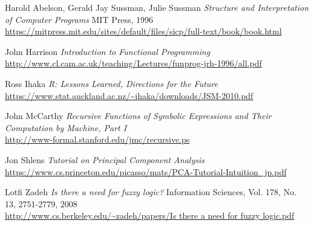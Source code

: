 \begin{thebibliography}{9}
  Harold Abelson, Gerald Jay Sussman, Julie Sussman
  \emph{Structure and Interpretation of Computer Programs}
  MIT Press, 1996 \\
  \url{https://mitpress.mit.edu/sites/default/files/sicp/full-text/book/book.html}

  John Harrison
  \emph{Introduction to Functional Programming} \\
  \url{http://www.cl.cam.ac.uk/teaching/Lectures/funprog-jrh-1996/all.pdf}

  Ross Ihaka
  \emph{R: Lessons Learned, Directions for the Future} \\
  \url{https://www.stat.auckland.ac.nz/~ihaka/downloads/JSM-2010.pdf}

  John McCarthy
  \emph{Recursive Functions of Symbolic Expressions and Their Computation by Machine, Part I} \\
  \url{http://www-formal.stanford.edu/jmc/recursive.ps}

  Jon Shlens
  \emph{Tutorial on Principal Component Analysis}
  \url{https://www.cs.princeton.edu/picasso/mats/PCA-Tutorial-Intuition_jp.pdf}

  Lotfi Zadeh
  \emph{Is there a need for fuzzy logic?}
  Information Sciences, Vol. 178, No. 13, 2751-2779, 2008 \\
  \url{http://www.cs.berkeley.edu/~zadeh/papers/Is there a need for fuzzy logic.pdf}

\end{thebibliography}
